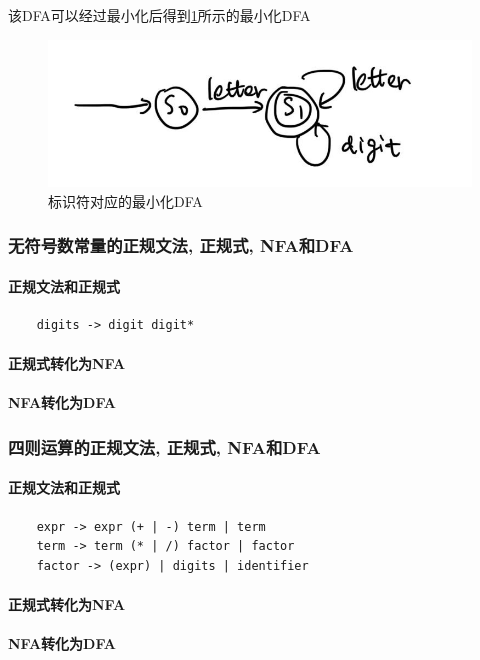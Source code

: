 \documentclass[lang=cn, a4paper]{elegantpaper}
\begin{document}
该DFA可以经过最小化后得到\ref{fig: id003}所示的最小化DFA

\begin{figure}[H]
	\centering
	\includegraphics[width=0.01\linewidth]{figs/id003.png}
	\caption{标识符对应的最小化DFA}
	\label{fig: id003}
\end{figure}

\subsubsection{无符号数常量的正规文法, 正规式, NFA和DFA}

\paragraph{正规文法和正规式}

\begin{lstlisting}
	digits -> digit digit*
\end{lstlisting}

\paragraph{正规式转化为NFA}

\paragraph{NFA转化为DFA}

\subsubsection{四则运算的正规文法, 正规式, NFA和DFA}

\paragraph{正规文法和正规式}

\begin{lstlisting}
	expr -> expr (+ | -) term | term
	term -> term (* | /) factor | factor
	factor -> (expr) | digits | identifier	
\end{lstlisting}

\paragraph{正规式转化为NFA}

\paragraph{NFA转化为DFA}
\end{document}
